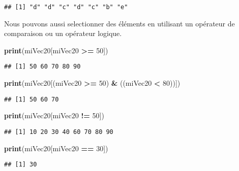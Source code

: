 \documentclass[]{book}
\newenvironment{Shaded}{\begin{snugshade}}{\end{snugshade}}
\newcommand{\KeywordTok}[1]{\textcolor[rgb]{0.13,0.29,0.53}{\textbf{#1}}}
\newcommand{\DecValTok}[1]{\textcolor[rgb]{0.00,0.00,0.81}{#1}}
\newcommand{\StringTok}[1]{\textcolor[rgb]{0.31,0.60,0.02}{#1}}
\newcommand{\OperatorTok}[1]{\textcolor[rgb]{0.81,0.36,0.00}{\textbf{#1}}}
\newcommand{\NormalTok}[1]{#1}
\theoremstyle{definition}
\theoremstyle{definition}
\theoremstyle{definition}
\theoremstyle{remark}
\begin{document}
\begin{verbatim}
## [1] "d" "d" "c" "d" "c" "b" "e"
\end{verbatim}

Nous pouvons aussi selectionner des éléments en utilisant un opérateur
de comparaison ou un opérateur logique.

\begin{Shaded}
\begin{Highlighting}[]
\KeywordTok{print}\NormalTok{(miVec20[miVec20 }\OperatorTok{>=}\StringTok{ }\DecValTok{50}\NormalTok{])}
\end{Highlighting}
\end{Shaded}

\begin{verbatim}
## [1] 50 60 70 80 90
\end{verbatim}

\begin{Shaded}
\begin{Highlighting}[]
\KeywordTok{print}\NormalTok{(miVec20[(miVec20 }\OperatorTok{>=}\StringTok{ }\DecValTok{50}\NormalTok{) }\OperatorTok{&}\StringTok{ }\NormalTok{((miVec20 }\OperatorTok{<}\StringTok{ }\DecValTok{80}\NormalTok{))])}
\end{Highlighting}
\end{Shaded}

\begin{verbatim}
## [1] 50 60 70
\end{verbatim}

\begin{Shaded}
\begin{Highlighting}[]
\KeywordTok{print}\NormalTok{(miVec20[miVec20 }\OperatorTok{!=}\StringTok{ }\DecValTok{50}\NormalTok{])}
\end{Highlighting}
\end{Shaded}

\begin{verbatim}
## [1] 10 20 30 40 60 70 80 90
\end{verbatim}

\begin{Shaded}
\begin{Highlighting}[]
\KeywordTok{print}\NormalTok{(miVec20[miVec20 }\OperatorTok{==}\StringTok{ }\DecValTok{30}\NormalTok{])}
\end{Highlighting}
\end{Shaded}

\begin{verbatim}
## [1] 30
\end{verbatim}
\end{document}
